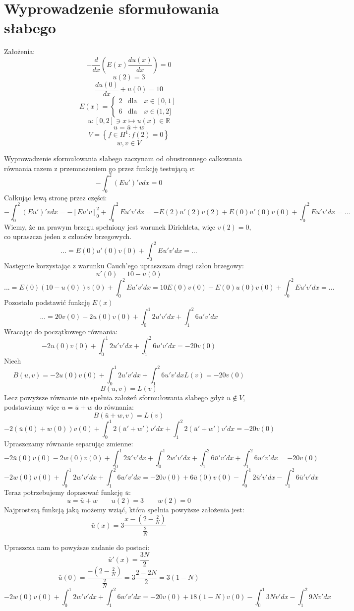 \documentclass[a4paper]{article}
\begin{document}
  \section{Wyprowadzenie sformułowania słabego}
  Założenia:
  \[-\frac{d}{dx}\left(E(x)\frac{du(x)}{dx}\right) = 0 \]
  \[u(2) = 3\]
  \[\frac{du(0)}{dx} + u(0) = 10\]
  \[E(x) =
  \begin{cases}
    2  & \text{dla} \quad x\in [0,1]\\
    6  & \text{dla} \quad x\in (1,2]
  \end{cases}\]
  \[u: [0,2] \ni x \mapsto u(x) \in \mathbb{R} \]
  \[u = \bar{u} + w\]
  \[V = \left\{f \in H^1 : f(2) = 0 \right\}\]
  \[w, v \in V\]

  Wyprowadzenie sformułowania słabego zaczynam od obustronnego całkowania równania 
  razem z przemnożeniem go przez funkcję testującą $v$:
  \[-\int_{0}^{2}(Eu')'v dx = 0\]
  Całkując lewą stronę przez części:
  \[-\int_{0}^{2}(Eu')'v dx = -\left[Eu'v\right]_0^2 + \int_{0}^{2}Eu'v' dx
  = -E(2)u'(2)v(2) + E(0)u'(0)v(0) + \int_{0}^{2}Eu'v' dx = ...\]
  Wiemy, że na prawym brzegu spełniony jest warunek Dirichleta, więc $v(2) = 0$, co upraszcza jeden z 
  członów brzegowych.
  \[... = E(0)u'(0)v(0) + \int_{0}^{2}Eu'v' dx = ... \]
  Następnie korzystając z warunku Cauch'ego upraszczam drugi człon brzegowy:
  \[u'(0) = 10 - u(0)\]
  \[... = E(0)(10 - u(0))v(0) + \int_{0}^{2}Eu'v' dx = 10E(0)v(0) - E(0)u(0)v(0) + \int_{0}^{2}Eu'v' dx = ... \]
  Pozostało podstawić funkcję $E(x)$ 
  \[... = 20v(0) - 2u(0)v(0) + \int_{0}^{1}2u'v'dx + \int_{1}^{2}6u'v' dx\]
  Wracając do początkowego równania:
  \[ -2u(0)v(0) + \int_{0}^{1}2u'v'dx + \int_{1}^{2}6u'v'dx = -20v(0)\]
  Niech 
  \[
    B(u, v) = -2u(0)v(0) + \int_{0}^{1}2u'v'dx + \int_{1}^{2}6u'v' dx 
    L(v) = -20v(0)
  \]
  \[B(u, v) = L(v)\]
  Lecz powyższe równanie nie spełnia założeń sformułowania słabego gdyż $u \notin V$,
  podstawiamy więc $u = \bar{u} + w$ do równania:
  \[B(\bar{u} + w, v) = L(v)\]
  \[-2(\bar{u}(0) + w(0))v(0) + \int_{0}^{1}2(\bar{u}' + w')v' dx + \int_{1}^{2}2(\bar{u}' + w')v' dx = -20v(0)\]
  Upraszczamy równanie separując zmienne:
  \[-2\bar{u}(0)v(0) -2w(0)v(0) + \int_{0}^{1}2\bar{u}'v'dx + \int_{0}^{1}2w'v' dx + \int_{1}^{2}6\bar{u}'v' dx + \int_{1}^{2}6w'v' dx = -20v(0)\]
  \[-2w(0)v(0) + \int_{0}^{1}2w'v' dx + \int_{1}^{2}6w'v' dx = -20v(0) + 6\bar{u}(0)v(0) - \int_{0}^{1}2\bar{u}'v'dx - \int_{1}^{2}6\bar{u}'v' dx\]
  Teraz potrzebujemy dopasować funkcję $\bar{u}$:
  \[u = \bar{u} + w \qquad u(2) = 3 \qquad w(2) = 0\]
  Najprostszą funkcją jaką możemy wziąć, która spełnia powyższe założenia jest:
  \[\bar{u}(x) = 3\frac{x - (2 - \frac{2}{N})}{\frac{2}{N}}\]
  
  Upraszcza nam to powyższe zadanie do postaci:
  \[\bar{u}'(x) = \frac{3N}{2}\]
  \[\bar{u}(0) = \frac{-(2-\frac{2}{N})}{\frac{2}{N}} = 3\frac{2-2N}{2} = 3(1-N)\]
  \[-2w(0)v(0) + \int_{0}^{1}2w'v' dx + \int_{1}^{2}6w'v' dx = -20v(0) + 18(1-N)v(0) - \int_{0}^{1}3Nv'dx - \int_{1}^{2}9Nv' dx\]
\end{document}
